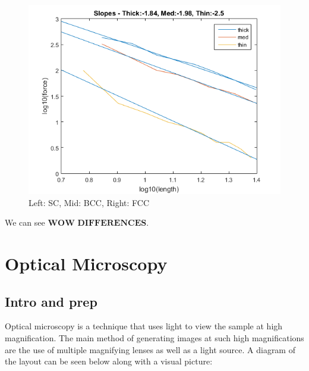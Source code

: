 \documentclass{article}
\begin{document}
\begin{figure}[h]
\begin{minipage}{0.32\textwidth}
	\end{minipage}
	\begin{minipage}{0.32\textwidth}
		\centering
		\includegraphics[scale=.3]{Lab1f1.png}
	\end{minipage}
	\caption{Left: SC, Mid: BCC, Right: FCC}
\end{figure}

We can see $\textbf{WOW DIFFERENCES}$.

\section{Optical Microscopy}

\subsection{Intro and prep}

Optical microscopy is a technique that uses light to view the sample at high magnification. The main method of generating images at such high magnifications are the use of multiple magnifying lenses as well as a light source. A diagram of the layout can be seen below along with a visual picture:
\end{document}
